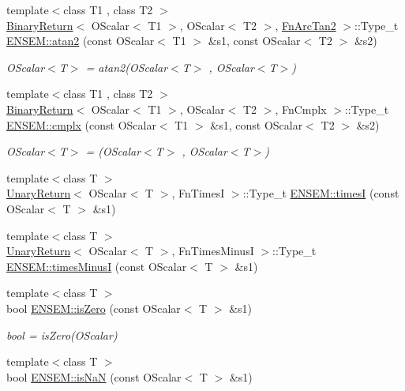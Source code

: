 \begin{DoxyCompactItemize}
{\footnotesize template$<$class T1 , class T2 $>$ }\\\mbox{\hyperlink{structBinaryReturn}{Binary\+Return}}$<$ O\+Scalar$<$ T1 $>$, O\+Scalar$<$ T2 $>$, \mbox{\hyperlink{structFnArcTan2}{Fn\+Arc\+Tan2}} $>$\+::Type\+\_\+t \mbox{\hyperlink{group__obsscalar_gaa28e2966b2f7ca96382766631b1e7bd1}{E\+N\+S\+E\+M\+::atan2}} (const O\+Scalar$<$ T1 $>$ \&s1, const O\+Scalar$<$ T2 $>$ \&s2)
\begin{DoxyCompactList}\small\item\em O\+Scalar$<$\+T$>$ = atan2(\+O\+Scalar$<$\+T$>$ , O\+Scalar$<$\+T$>$) \end{DoxyCompactList}\item 
{\footnotesize template$<$class T1 , class T2 $>$ }\\\mbox{\hyperlink{structBinaryReturn}{Binary\+Return}}$<$ O\+Scalar$<$ T1 $>$, O\+Scalar$<$ T2 $>$, Fn\+Cmplx $>$\+::Type\+\_\+t \mbox{\hyperlink{group__obsscalar_gabf1bc6f0ef1fc4fa374ff48fddcbe9b3}{E\+N\+S\+E\+M\+::cmplx}} (const O\+Scalar$<$ T1 $>$ \&s1, const O\+Scalar$<$ T2 $>$ \&s2)
\begin{DoxyCompactList}\small\item\em O\+Scalar$<$\+T$>$ = (O\+Scalar$<$\+T$>$ , O\+Scalar$<$\+T$>$) \end{DoxyCompactList}\item 
{\footnotesize template$<$class T $>$ }\\\mbox{\hyperlink{structUnaryReturn}{Unary\+Return}}$<$ O\+Scalar$<$ T $>$, Fn\+TimesI $>$\+::Type\+\_\+t \mbox{\hyperlink{group__obsscalar_gad7403718b5f9341f1aafa59ca287ea31}{E\+N\+S\+E\+M\+::timesI}} (const O\+Scalar$<$ T $>$ \&s1)
\item 
{\footnotesize template$<$class T $>$ }\\\mbox{\hyperlink{structUnaryReturn}{Unary\+Return}}$<$ O\+Scalar$<$ T $>$, Fn\+Times\+MinusI $>$\+::Type\+\_\+t \mbox{\hyperlink{group__obsscalar_ga1dc10f8daa357f1e30ce7e8bce41c52e}{E\+N\+S\+E\+M\+::times\+MinusI}} (const O\+Scalar$<$ T $>$ \&s1)
\item 
{\footnotesize template$<$class T $>$ }\\bool \mbox{\hyperlink{group__obsscalar_gacdda3d4e73f6b414d6c2d99e3f69af85}{E\+N\+S\+E\+M\+::is\+Zero}} (const O\+Scalar$<$ T $>$ \&s1)
\begin{DoxyCompactList}\small\item\em bool = is\+Zero(\+O\+Scalar) \end{DoxyCompactList}\item 
{\footnotesize template$<$class T $>$ }\\bool \mbox{\hyperlink{group__obsscalar_ga265314c3773d12257146fec9dd1c2524}{E\+N\+S\+E\+M\+::is\+NaN}} (const O\+Scalar$<$ T $>$ \&s1)

\end{DoxyCompactItemize}

